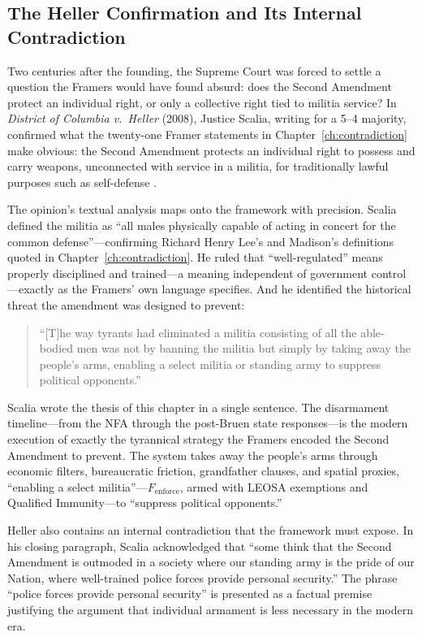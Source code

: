 \subsection{The Heller Confirmation and Its Internal Contradiction}

Two centuries after the founding, the Supreme Court was forced to settle a question the Framers would have found absurd: does the Second Amendment protect an individual right, or only a collective right tied to militia service? In \textit{District of Columbia v.\ Heller} (2008), Justice Scalia, writing for a 5--4 majority, confirmed what the twenty-one Framer statements in Chapter~\ref{ch:contradiction} make obvious: the Second Amendment protects an individual right to possess and carry weapons, unconnected with service in a militia, for traditionally lawful purposes such as self-defense \cite{heller}.

The opinion's textual analysis maps onto the framework with precision. Scalia defined the militia as ``all males physically capable of acting in concert for the common defense''---confirming Richard Henry Lee's and Madison's definitions quoted in Chapter~\ref{ch:contradiction}. He ruled that ``well-regulated'' means properly disciplined and trained---a meaning independent of government control---exactly as the Framers' own language specifies. And he identified the historical threat the amendment was designed to prevent:

\begin{quote}
``[T]he way tyrants had eliminated a militia consisting of all the able-bodied men was not by banning the militia but simply by taking away the people's arms, enabling a select militia or standing army to suppress political opponents.'' \cite{heller}
\end{quote}

Scalia wrote the thesis of this chapter in a single sentence. The disarmament timeline---from the NFA through the post-Bruen state responses---is the modern execution of exactly the tyrannical strategy the Framers encoded the Second Amendment to prevent. The system takes away the people's arms through economic filters, bureaucratic friction, grandfather clauses, and spatial proxies, ``enabling a select militia''---$F_{\text{enforce}}$, armed with LEOSA exemptions and Qualified Immunity---to ``suppress political opponents.''

Heller also contains an internal contradiction that the framework must expose. In his closing paragraph, Scalia acknowledged that ``some think that the Second Amendment is outmoded in a society where our standing army is the pride of our Nation, where well-trained police forces provide personal security.'' The phrase ``police forces provide personal security'' is presented as a factual premise justifying the argument that individual armament is less necessary in the modern era.

